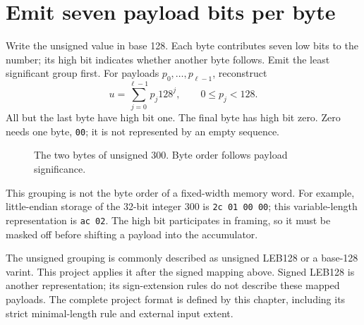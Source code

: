 \section{Emit seven payload bits per byte}
Write the unsigned value in base 128. Each byte contributes seven low bits to the
number; its high bit indicates whether another byte follows. Emit the least significant
group first. For payloads \(p_0,\ldots,p_{\ell-1}\), reconstruct
\[
 u=\sum_{j=0}^{\ell-1}p_j128^j,\qquad0\leq p_j<128.
\]
All but the last byte have high bit one. The final byte has high bit zero. Zero needs
one byte, \texttt{00}; it is not represented by an empty sequence.

\begin{figure}[htbp]
\centering
{}
\caption{The two bytes of unsigned 300. Byte order follows payload significance.}
\end{figure}

This grouping is not the byte order of a fixed-width memory word. For example,
little-endian storage of the 32-bit integer 300 is \texttt{2c 01 00 00}; this
variable-length representation is \texttt{ac 02}. The high bit participates in framing,
so it must be masked off before shifting a payload into the accumulator.

The unsigned grouping is commonly described as unsigned LEB128 or a base-128 varint.
This project applies it after the signed mapping above. Signed LEB128 is another
representation; its sign-extension rules do not describe these mapped payloads.
The complete project format is defined by this chapter, including its strict
minimal-length rule and external input extent.
